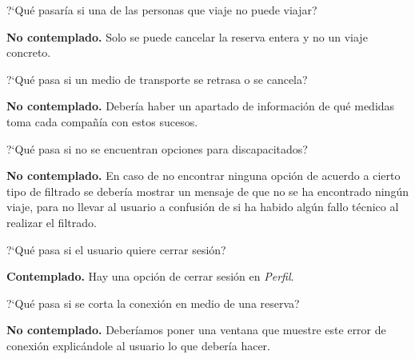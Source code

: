 \begin{escenario} %
    \centering
    ?`Qué pasaría si una de las personas que viaje no puede viajar?

    \begin{solucion}
        \centering
        \textbf{No contemplado.} Solo se puede cancelar la reserva entera y no un viaje concreto.
    \end{solucion}
\end{escenario}

\begin{escenario} %
    \centering
    ?`Qué pasa si un medio de transporte se retrasa o se cancela?

    \begin{solucion}
        \centering
        \textbf{No contemplado.} Debería haber un apartado de información de qué medidas toma cada compañía con estos sucesos.
    \end{solucion}
\end{escenario}

\begin{escenario} %
    \centering
    ?`Qué pasa si no se encuentran opciones para discapacitados?

    \begin{solucion}
        \centering
        \textbf{No contemplado.} En caso de no encontrar ninguna opción de acuerdo a cierto tipo de
        filtrado se debería mostrar un mensaje de que no se ha encontrado ningún viaje, para no
        llevar al usuario a confusión de si ha habido algún fallo técnico al realizar el filtrado.
    \end{solucion}
\end{escenario}

\begin{escenario} %
    \centering
    ?`Qué pasa si el usuario quiere cerrar sesión?

    \begin{solucion}
        \centering
        \textbf{Contemplado.} Hay una opción de cerrar sesión en \textit{Perfil}.
    \end{solucion}
\end{escenario}

\begin{escenario} %
    \centering
    ?`Qué pasa si se corta la conexión en medio de una reserva?

    \begin{solucion}
        \centering
        \textbf{No contemplado.} Deberíamos poner una ventana que muestre este error de conexión explicándole al usuario lo que debería hacer.
    \end{solucion}
\end{escenario}